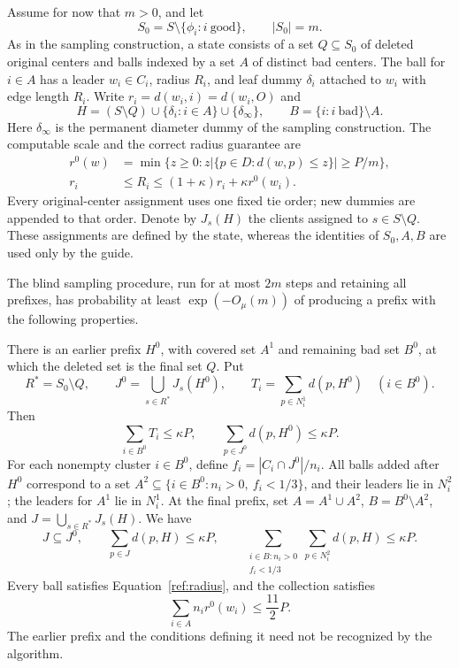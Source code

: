Assume for now that $m>0$, and let
\[
 S_0=S\setminus\{\phi_i:i\ \mathrm{good}\},\qquad |S_0|=m.
\]
As in the sampling construction, a state consists of a set $Q\subseteq S_0$
of deleted original centers and balls indexed by a set $A$ of distinct bad
centers.  The ball for $i\in A$ has a leader $w_i\in C_i$, radius $R_i$, and
leaf dummy $\delta_i$ attached to $w_i$ with edge length $R_i$.  Write
$r_i=d(w_i,i)=d(w_i,O)$ and
\[
 H=(S\setminus Q)\cup\{\delta_i:i\in A\}\cup\{\delta_\infty\},
 \qquad B=\{i:i\ \mathrm{bad}\}\setminus A.
\]
Here $\delta_\infty$ is the permanent diameter dummy of the sampling
construction.  The computable scale and the correct radius guarantee are
\begin{equation}\label{ref:radius}
 \begin{split}
 r^0(w)&=\min\{z\ge0:
       z|\{p\in D:d(w,p)\le z\}|\ge P/m\},\\
 r_i&\le R_i\le(1+\kappa)r_i+\kappa r^0(w_i).
 \end{split}
\end{equation}
Every original-center assignment uses one fixed tie order; new dummies are
appended to that order.  Denote by $J_s(H)$ the clients assigned to
$s\in S\setminus Q$.  These assignments are defined by the state, whereas
the identities of $S_0,A,B$ are used only by the guide.

\begin{lemma}\label{ref:two-stage}
The blind sampling procedure, run for at most $2m$ steps and retaining all
prefixes, has probability at least $\exp(-O_\mu(m))$ of producing a prefix
with the following properties.

There is an earlier prefix $H^0$, with covered set $A^1$ and remaining bad set
$B^0$, at which the deleted set is the final set $Q$.  Put
\[
 R^*=S_0\setminus Q,\qquad
 J^0=\bigcup_{s\in R^*}J_s(H^0),\qquad
 T_i=\sum_{p\in N_i^1}d(p,H^0)\quad(i\in B^0).
\]
Then
\begin{equation}\label{ref:first-stop}
 \sum_{i\in B^0}T_i\le\kappa P,
 \qquad \sum_{p\in J^0}d(p,H^0)\le\kappa P.
\end{equation}
For each nonempty cluster $i\in B^0$, define
$f_i=|C_i\cap J^0|/n_i$.  All balls added after $H^0$ correspond to a set
$A^2\subseteq\{i\in B^0:n_i>0,\ f_i<1/3\}$, and their leaders lie in
$N_i^2$; the leaders for $A^1$ lie in $N_i^1$.  At the final prefix, set
$A=A^1\cup A^2$, $B=B^0\setminus A^2$, and
$J=\bigcup_{s\in R^*}J_s(H)$.  We have
\begin{equation}\label{ref:second-stop}
 J\subseteq J^0,\qquad
 \sum_{p\in J}d(p,H)\le\kappa P,\qquad
 \sum_{\substack{i\in B:n_i>0\\ f_i<1/3}}
       \sum_{p\in N_i^2}d(p,H)\le\kappa P.
\end{equation}
Every ball satisfies Equation~\eqref{ref:radius}, and the collection satisfies
\begin{equation}\label{ref:radius-sum}
 \sum_{i\in A}n_i r^0(w_i)\le\frac{11}{2}P.
\end{equation}
The earlier prefix and the conditions defining it need not be recognized by
the algorithm.
\end{lemma}

